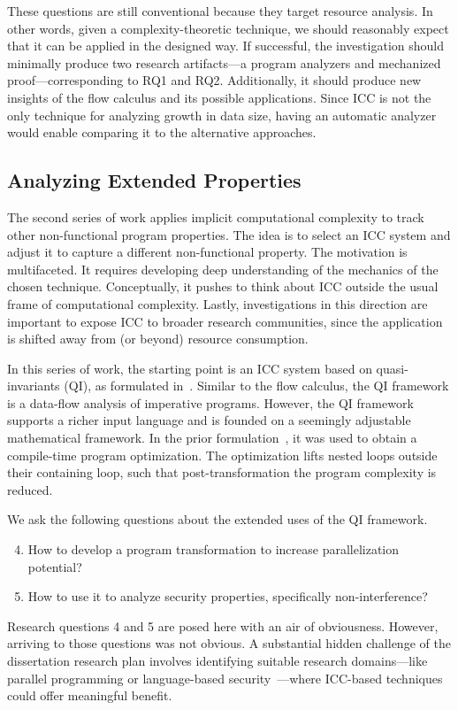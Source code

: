 These questions are still conventional because they target resource analysis. In
other words, given a complexity-theoretic technique, we should reasonably expect
that it can be applied in the designed way. If successful, the investigation
should minimally produce two research artifacts---a program analyzers and
mechanized proof---corresponding to RQ1 and RQ2. Additionally, it should produce
new insights of the flow calculus and its possible applications. Since ICC is
not the only technique for analyzing growth in data size, having an automatic
analyzer would enable comparing it to the alternative approaches.

\subsection{Analyzing Extended Properties}
\label{subsec:extended-props}

The second series of work applies implicit computational complexity to track
{other} non-functional program properties. The
idea is to select an ICC system and adjust it to capture a different
non-functional property. The motivation is multifaceted. It requires developing
deep understanding of the mechanics of the chosen technique. Conceptually, it
pushes to think about ICC outside the usual frame of computational complexity.
Lastly, investigations in this direction are important to expose ICC to broader
research communities, since the application is shifted away from (or beyond)
resource consumption.

In this series of work, the starting point is an ICC system based on
quasi-invariants (QI), as formulated in~\cite{moyen20172}. Similar to the flow
calculus, the QI framework is a data-flow analysis of imperative
programs. However, the QI framework supports a richer
input language and is founded on a seemingly adjustable mathematical framework.
In the prior formulation~\cite{moyen20172}, it was used to obtain a compile-time
program optimization. The optimization lifts nested loops outside their
containing loop, such that post-transformation the program complexity is
reduced.

We ask the following questions about the extended uses of the QI framework.
\begin{enumerate}[label={(RQ\arabic*)},leftmargin=*,labelindent=1em]
\setcounter{enumi}{3}
\item How to develop a program transformation to increase parallelization
potential?
\item How to use it to analyze security properties, specifically
non-interference?
\end{enumerate}
Research questions 4 and 5 are posed here with an air of obviousness. However,
arriving to those questions was not obvious. A substantial hidden challenge of
the dissertation research plan involves identifying suitable research
domains---like parallel programming or language-based
security~\cite{sabelfeld2003}---where ICC-based techniques could offer
meaningful benefit.

